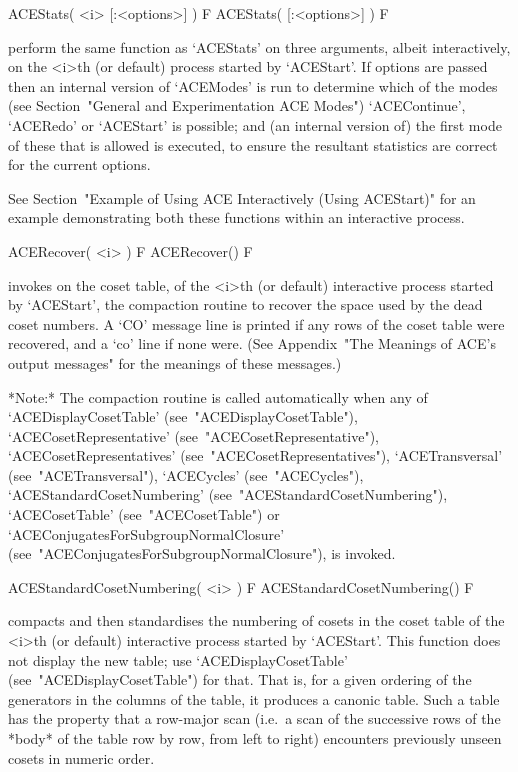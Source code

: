 \>ACEStats( <i> [:<options>] ) F
\>ACEStats( [:<options>] ) F

perform the same function as `ACEStats'  on  three  arguments,  albeit
interactively,  on  the  <i>th  (or  default)   process   started   by
`ACEStart'.  If  options  are  passed  then  an  internal  version  of
`ACEModes'  is  run   to   determine   which   of   the   modes   (see
Section~"General  and  Experimentation  ACE   Modes")   `ACEContinue',
`ACERedo' or `ACEStart' is possible; and (an internal version of)  the
first mode of these  that  is  allowed  is  executed,  to  ensure  the
resultant statistics are correct for the current options.

See Section~"Example of Using ACE Interactively (Using ACEStart)"  for
an example demonstrating both these functions  within  an  interactive
process.

\enditems


\beginitems

\>ACERecover( <i> ) F
\>ACERecover() F

invokes on the coset table, of  the  <i>th  (or  default)  interactive
{\ACE} process  started  by  `ACEStart',  the  compaction  routine  to
recover the space used by  the  dead  coset  numbers. A `CO' message line is printed if any  rows  of  the  coset
table were recovered, and a `co' line if none were. (See Appendix~"The
Meanings  of  ACE's  output  messages"  for  the  meanings  of   these
messages.)

*Note:*
The  compaction  routine  is  called   automatically   when   any   of
`ACEDisplayCosetTable'                   (see~"ACEDisplayCosetTable"),
`ACECosetRepresentative'               (see~"ACECosetRepresentative"),
`ACECosetRepresentatives'             (see~"ACECosetRepresentatives"),
`ACETransversal'          (see~"ACETransversal"),          `ACECycles'
(see~"ACECycles"),                         `ACEStandardCosetNumbering'
(see~"ACEStandardCosetNumbering"),                     `ACECosetTable'
(see~"ACECosetTable")    or    `ACEConjugatesForSubgroupNormalClosure'
(see~"ACEConjugatesForSubgroupNormalClosure"), is invoked.

\>ACEStandardCosetNumbering( <i> ) F
\>ACEStandardCosetNumbering() F

compacts and then standardises the numbering of cosets  in  the  coset
table of the <i>th (or default) interactive {\ACE} process started  by
`ACEStart'.  This  function  does  not  display  the  new  table;  use
`ACEDisplayCosetTable' (see~"ACEDisplayCosetTable") for that. That is,
for a given ordering of the generators in the columns of the table, it
produces a canonic table.  Such  a  table  has  the  property  that  a
row-major scan (i.e.~a scan of the successive rows of  the  *body*  of
the table row by row, from left to right) encounters previously unseen
cosets in numeric order.


